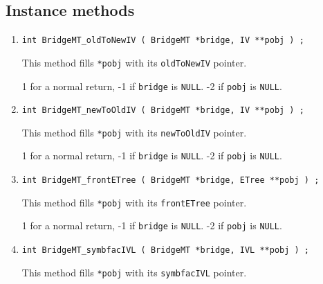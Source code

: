 \subsection{Instance methods}
\label{subsection:BridgeMT:proto:instance}
\par
\begin{enumerate}
\item
\begin{verbatim}
int BridgeMT_oldToNewIV ( BridgeMT *bridge, IV **pobj ) ;
\end{verbatim}
This method fills \texttt{*pobj} with its \texttt{oldToNewIV} pointer.
\par {}
1 for a normal return, 
-1 if \texttt{bridge} is \texttt{NULL}.
-2 if \texttt{pobj} is \texttt{NULL}.
\item
\begin{verbatim}
int BridgeMT_newToOldIV ( BridgeMT *bridge, IV **pobj ) ;
\end{verbatim}
This method fills \texttt{*pobj} with its \texttt{newToOldIV} pointer.
\par {}
1 for a normal return, 
-1 if \texttt{bridge} is \texttt{NULL}.
-2 if \texttt{pobj} is \texttt{NULL}.
\item
\begin{verbatim}
int BridgeMT_frontETree ( BridgeMT *bridge, ETree **pobj ) ;
\end{verbatim}
This method fills \texttt{*pobj} with its \texttt{frontETree} pointer.
\par {}
1 for a normal return, 
-1 if \texttt{bridge} is \texttt{NULL}.
-2 if \texttt{pobj} is \texttt{NULL}.
\item
\begin{verbatim}
int BridgeMT_symbfacIVL ( BridgeMT *bridge, IVL **pobj ) ;
\end{verbatim}
This method fills \texttt{*pobj} with its \texttt{symbfacIVL} pointer.

\end{enumerate}
